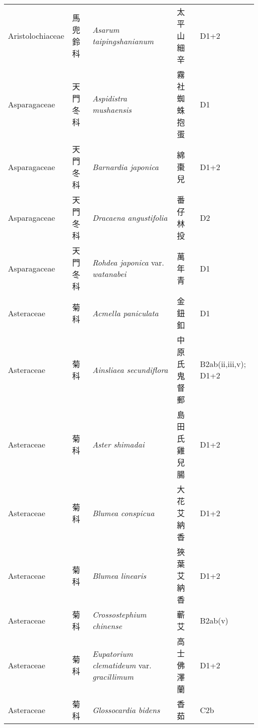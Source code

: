{\begin{longtable}{p{2.5cm}p{2.5cm}p{4.5cm}p{2.5cm}p{3cm}}
    Aristolochiaceae & 馬兜鈴科 & \textit{Asarum taipingshanianum}  & 太平山細辛 & D1+2 \index{Asarum@\textit{Asarum}!taipingshanianum@\textit{taipingshanianum}}  \index{太平山細辛} \\
    Asparagaceae & 天門冬科 & \textit{Aspidistra mushaensis}  & 霧社蜘蛛抱蛋 & D1 \index{Aspidistra@\textit{Aspidistra}!mushaensis@\textit{mushaensis}}  \index{霧社蜘蛛抱蛋} \\
    Asparagaceae & 天門冬科 & \textit{Barnardia japonica}  & 綿棗兒 & D1+2 \index{Barnardia@\textit{Barnardia}!japonica@\textit{japonica}}  \index{綿棗兒} \\
    Asparagaceae & 天門冬科 & \textit{Dracaena angustifolia}  & 番仔林投 & D2 \index{Dracaena@\textit{Dracaena}!angustifolia@\textit{angustifolia}}  \index{番仔林投} \\
    Asparagaceae & 天門冬科 & \textit{Rohdea japonica} var. \textit{watanabei}  & 萬年青 & D1 \index{Rohdea@\textit{Rohdea}!japonica@\textit{japonica}!var. watanabei@var. \textit{watanabei}}  \index{萬年青} \\
    Asteraceae & 菊科 & \textit{Acmella paniculata}  & 金鈕釦 & D1 \index{Acmella@\textit{Acmella}!paniculata@\textit{paniculata}}  \index{金鈕釦} \\
    Asteraceae & 菊科 & \textit{Ainsliaea secundiflora}  & 中原氏鬼督郵 & B2ab(ii,iii,v); D1+2 \index{Ainsliaea@\textit{Ainsliaea}!secundiflora@\textit{secundiflora}}  \index{中原氏鬼督郵} \\
    Asteraceae & 菊科 & \textit{Aster shimadai}  & 島田氏雞兒腸 & D1+2 \index{Aster@\textit{Aster}!shimadai@\textit{shimadai}}  \index{島田氏雞兒腸} \\
    Asteraceae & 菊科 & \textit{Blumea conspicua}  & 大花艾納香 & D1+2 \index{Blumea@\textit{Blumea}!conspicua@\textit{conspicua}}  \index{大花艾納香} \\
    Asteraceae & 菊科 & \textit{Blumea linearis}  & 狹葉艾納香 & D1+2 \index{Blumea@\textit{Blumea}!linearis@\textit{linearis}}  \index{狹葉艾納香} \\
    Asteraceae & 菊科 & \textit{Crossostephium chinense}  & 蘄艾 & B2ab(v) \index{Crossostephium@\textit{Crossostephium}!chinense@\textit{chinense}}  \index{蘄艾} \\
    Asteraceae & 菊科 & \textit{Eupatorium clematideum} var. \textit{gracillimum}  & 高士佛澤蘭 & D1+2 \index{Eupatorium@\textit{Eupatorium}!clematideum@\textit{clematideum}!var. gracillimum@var. \textit{gracillimum}}  \index{高士佛澤蘭} \\
    Asteraceae & 菊科 & \textit{Glossocardia bidens}  & 香茹 & C2b \index{Glossocardia@\textit{Glossocardia}!bidens@\textit{bidens}}  \index{香茹} \\

\end{longtable}}
